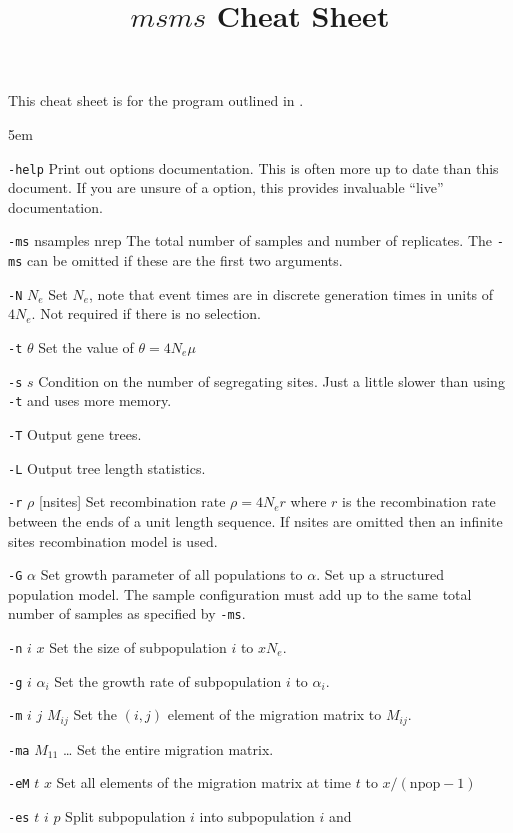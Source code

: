 \documentclass{article}
\begin{document}
\title{$msms$ Cheat Sheet} 
\maketitle
This cheat sheet is for the program outlined in \cite{ewing_2010}.
\begin{eqlist*}{\topsep5em}
\item[{\tt -help}] Print out options documentation. This 
is often more up to date than this document. If you are unsure of a option, this
provides invaluable ``live'' documentation.
\item[{\tt -ms} nsamples nrep \quad] The total number of samples and number of
replicates. The {\tt -ms} can be omitted if these are the first two arguments.
\item[{\tt -N} $N_e$] Set $N_e$, note that event times are in
discrete generation times in units of $4N_e$. Not required if there is no
selection. 
\item[{\tt -t} $\theta$] Set the value of $\theta=4N_e\mu$
\item[{\tt -s} $s$] Condition on the number of segregating sites. Just a little
slower than using {\tt -t} and uses more memory.
\item[{\tt -T}] Output gene trees.
\item[{\tt -L}] Output tree length statistics. 
\item[{\tt -r} $\rho$ {[nsites]} ] Set recombination rate $\rho=4N_er$ where
$r$ is the recombination rate between the ends of a unit length sequence. If nsites
are omitted then an infinite sites recombination model is used.   
\item[{\tt -G} $\alpha$] Set growth parameter of all populations to $\alpha$. 
 Set up a structured population
model. The sample configuration must add up to the same total number of samples
as specified by {\tt -ms}.
\item[{\tt -n} $i$ $x$] Set the size of subpopulation $i$ to $xN_e$. 
\item[{\tt -g} $i$ $\alpha_i$] Set the growth rate of subpopulation $i$ to
$\alpha_i$.
\item[{\tt -m} $i$ $j$ $M_{ij}$] Set the $(i,j)$ element of the migration
matrix to $M_{ij}$.
\item[{\tt -ma} $M_{11}$ \ldots] Set the entire migration matrix.
\item[{\tt -eM} $t$ $x$] Set all elements of the migration matrix at time $t$
to $x/(\textrm{npop}-1)$
\item[{\tt -es} $t$ $i$ $p$] Split subpopulation $i$ into subpopulation $i$ and

\end{eqlist*}
\end{document}
